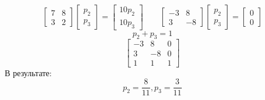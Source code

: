 \[
\begin{bmatrix}
7 & 8 \\
3 & 2
\end{bmatrix}
\begin{bmatrix}
p_2 \\ p_3
\end{bmatrix}
=
\begin{bmatrix}
10 p_2 \\ 10 p_3
\end{bmatrix}
~~~~~~~~~
\begin{bmatrix}
-3 & 8 \\
3 & -8
\end{bmatrix}
\begin{bmatrix}
p_2 \\ p_3
\end{bmatrix}
=
\begin{bmatrix}
0 \\ 0
\end{bmatrix}
\]
\[ p_2 + p_3 = 1 \]
\[
\left[
\begin{array}{rr|r}
-3 & 8 & 0 \\
3 & -8 & 0 \\
1 & 1 & 1
\end{array}
\right]
\]
В результате:
\[ p_2 = \frac{8}{11}, p_3 = \frac{3}{11} \]

 